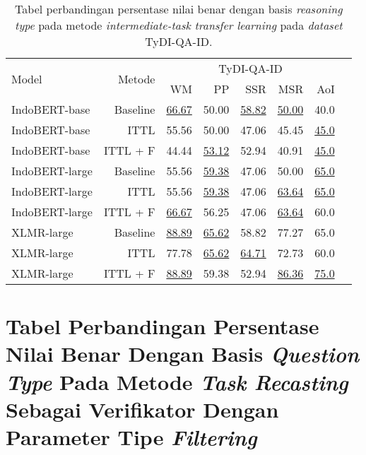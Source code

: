 \begin{table}[H]\centering
\begin{tabular}{lrrrrrrr}\toprule
\multirow{2}{*}{Model} &\multirow{2}{*}{Metode} &\multicolumn{5}{c}{TyDI-QA-ID} \\\cmidrule{3-7}
& &WM &PP &SSR &MSR &AoI \\\midrule
IndoBERT-base &Baseline &\underline{66.67} &50.00 &\underline{58.82} &\underline{50.00} &40.0 \\
IndoBERT-base &ITTL &55.56 &50.00 &47.06 &45.45 &\underline{45.0} \\
IndoBERT-base &ITTL + F &44.44 &\underline{53.12} &52.94 &40.91 &\underline{45.0} \\
\hline
IndoBERT-large &Baseline &55.56 &\underline{59.38} &47.06 &50.00 &\underline{65.0} \\
IndoBERT-large &ITTL &55.56 &\underline{59.38} &47.06 &\underline{63.64} &\underline{65.0} \\
IndoBERT-large &ITTL + F &\underline{66.67} &56.25 &47.06 &\underline{63.64} &60.0 \\
\hline
XLMR-large &Baseline &\underline{88.89} &\underline{65.62} &58.82 &77.27 &65.0 \\
XLMR-large &ITTL &77.78 &\underline{65.62} &\underline{64.71} &72.73 &60.0 \\
XLMR-large &ITTL + F &\underline{88.89} &59.38 &52.94 &\underline{86.36} &\underline{75.0} \\
\bottomrule
\end{tabular}
\caption{Tabel perbandingan persentase nilai benar dengan basis \emph{reasoning type} pada metode \emph{intermediate-task transfer learning} pada \emph{dataset} TyDI-QA-ID.}
\end{table}

\section*{Tabel Perbandingan Persentase Nilai Benar Dengan Basis \emph{Question Type} Pada Metode \emph{Task Recasting} Sebagai Verifikator Dengan Parameter Tipe \emph{Filtering}}

